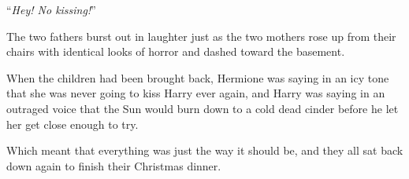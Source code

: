 ``\emph{Hey! No kissing!}''

The two fathers burst out in laughter just as the two mothers rose up from their chairs with identical looks of horror and dashed toward the basement.

When the children had been brought back, Hermione was saying in an icy tone that she was never going to kiss Harry ever again, and Harry was saying in an outraged voice that the Sun would burn down to a cold dead cinder before he let her get close enough to try.

Which meant that everything was just the way it should be, and they all sat back down again to finish their Christmas dinner.
